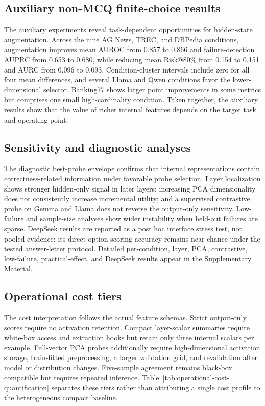 \documentclass[preprint,12pt,authoryear]{elsarticle}
\begin{document}
\subsection{Auxiliary non-MCQ finite-choice results}
The auxiliary experiments reveal task-dependent opportunities for hidden-state augmentation. Across the nine AG News, TREC, and DBPedia conditions, augmentation improves mean AUROC from 0.857 to 0.866 and failure-detection AUPRC from 0.653 to 0.680, while reducing mean Risk@80\% from 0.154 to 0.151 and AURC from 0.096 to 0.093. Condition-cluster intervals include zero for all four mean differences, and several Llama and Qwen conditions favor the lower-dimensional selector. Banking77 shows larger point improvements in some metrics but comprises one small high-cardinality condition. Taken together, the auxiliary results show that the value of richer internal features depends on the target task and operating point.


\FloatBarrier

\subsection{Sensitivity and diagnostic analyses}
The diagnostic best-probe envelope confirms that internal representations contain correctness-related information under favorable probe selection. Layer localization shows stronger hidden-only signal in later layers; increasing PCA dimensionality does not consistently increase incremental utility; and a supervised contrastive probe on Gemma and Llama does not reverse the output-only sensitivity. Low-failure and sample-size analyses show wider instability when held-out failures are sparse. DeepSeek results are reported as a post hoc interface stress test, not pooled evidence: its direct option-scoring accuracy remains near chance under the tested answer-letter protocol. Detailed per-condition, layer, PCA, contrastive, low-failure, practical-effect, and DeepSeek results appear in the Supplementary Material.

\subsection{Operational cost tiers}
The cost interpretation follows the actual feature schemas. Strict output-only scores require no activation retention. Compact layer-scalar summaries require white-box access and extraction hooks but retain only three internal scalars per example. Full-vector PCA probes additionally require high-dimensional activation storage, train-fitted preprocessing, a larger validation grid, and revalidation after model or distribution changes. Five-sample agreement remains black-box compatible but requires repeated inference. Table~\ref{tab:operational-cost-quantification} separates these tiers rather than attributing a single cost profile to the heterogeneous compact baseline.
\end{document}

